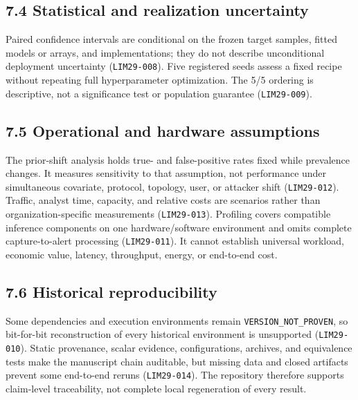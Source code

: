 \documentclass[preprint,12pt]{elsarticle}
\begin{document}
\subsection{7.4 Statistical and realization uncertainty}
Paired confidence intervals are conditional on the frozen target samples, fitted models or arrays, and implementations; they do not describe unconditional deployment uncertainty (\texttt{LIM29-008}). Five registered seeds assess a fixed recipe without repeating full hyperparameter optimization. The 5/5 ordering is descriptive, not a significance test or population guarantee (\texttt{LIM29-009}).

\subsection{7.5 Operational and hardware assumptions}
The prior-shift analysis holds true- and false-positive rates fixed while prevalence changes. It measures sensitivity to that assumption, not performance under simultaneous covariate, protocol, topology, user, or attacker shift (\texttt{LIM29-012}). Traffic, analyst time, capacity, and relative costs are scenarios rather than organization-specific measurements (\texttt{LIM29-013}). Profiling covers compatible inference components on one hardware/software environment and omits complete capture-to-alert processing (\texttt{LIM29-011}). It cannot establish universal workload, economic value, latency, throughput, energy, or end-to-end cost.

\subsection{7.6 Historical reproducibility}
Some dependencies and execution environments remain \texttt{VERSION\_NOT\_PROVEN}, so bit-for-bit reconstruction of every historical environment is unsupported (\texttt{LIM29-010}). Static provenance, scalar evidence, configurations, archives, and equivalence tests make the manuscript chain auditable, but missing data and closed artifacts prevent some end-to-end reruns (\texttt{LIM29-014}). The repository therefore supports claim-level traceability, not complete local regeneration of every result.
\end{document}
